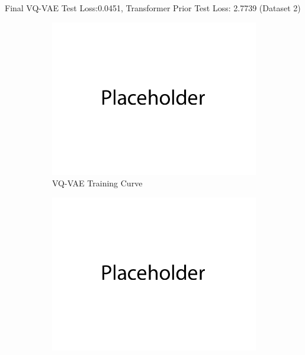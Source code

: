 \documentclass{article}
\begin{document}
   \newpage

   Final VQ-VAE Test Loss:0.0451, Transformer Prior Test Loss: 2.7739 (Dataset 2)
   \begin{figure}[H]
          \centering
          \begin{subfigure}[b]{0.475\textwidth}
              \centering
              \includegraphics[width=\textwidth]{figures/q3_dset2_vqvae_train_plot.png}
              \caption{VQ-VAE Training Curve}
          \end{subfigure}
          \hfill
          \begin{subfigure}[b]{0.475\textwidth}
              \centering
              \includegraphics[width=\textwidth]{figures/q3_dset2_prior_train_plot.png}

\end{subfigure}
\end{figure}
\end{document}
